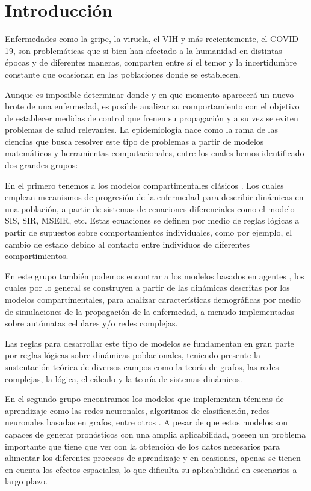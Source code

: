 \chapter{Introducción}\label{ch;Introduccion}

Enfermedades como la gripe, la viruela, el VIH y más recientemente, el COVID-19, son problemáticas que si bien han afectado a la humanidad en distintas épocas y de diferentes maneras, comparten entre sí el temor y la incertidumbre constante que ocasionan en las poblaciones donde se establecen.

Aunque es imposible determinar donde y en que momento aparecerá un nuevo brote de una enfermedad, es posible analizar su comportamiento con el objetivo de establecer medidas de control que frenen su propagación y a su vez se eviten problemas de salud relevantes. La epidemiología nace como la rama de las ciencias que busca resolver este tipo de problemas a partir de modelos matemáticos y herramientas computacionales, entre los cuales hemos identificado dos grandes grupos: 

En el primero tenemos a los modelos compartimentales clásicos \cite{kermack, miller, hertbert, mateModelsInPopulationAndEpidemiology, diego2010}. Los cuales emplean mecanismos de progresión de la enfermedad para describir dinámicas en una población, a partir de sistemas de ecuaciones diferenciales como el modelo SIS, SIR, MSEIR, etc. Estas ecuaciones se definen por medio de reglas lógicas a partir de supuestos sobre comportamientos individuales, como por ejemplo, el cambio de estado debido al contacto entre individuos de diferentes compartimientos.
    
En este grupo también podemos encontrar a los modelos basados en agentes \cite{spatialDependences,populationDensity,modelingEpidemicsUsingCA, globalStochastic}, los cuales por lo general se construyen a partir de las dinámicas descritas por los modelos compartimentales, para analizar características demográficas por medio de simulaciones de la propagación de la enfermedad, a menudo implementadas sobre autómatas celulares y/o redes complejas. 
    
Las reglas para desarrollar este tipo de modelos se fundamentan en gran parte por reglas lógicas sobre dinámicas poblacionales, teniendo presente la sustentación teórica de diversos campos como la teoría de grafos, las redes complejas, la lógica, el cálculo y la teoría de sistemas dinámicos.

En el segundo grupo encontramos los modelos que implementan técnicas de aprendizaje como las redes neuronales, algoritmos de clasificación, redes neuronales basadas en grafos, entre otros \cite{stayHome, epidemiologicalNeuralNetwork, colaGNN, combiningGraph, forecasting, fromNeuronsToEpidemics, networksAndepidemics, transfer2021}. A pesar de que estos modelos son capaces de generar pronósticos con una amplia aplicabilidad, poseen un problema importante que tiene que ver con la obtención de los datos necesarios para alimentar los diferentes procesos de aprendizaje y en ocasiones, apenas se tienen en cuenta los efectos espaciales, lo que dificulta su aplicabilidad en escenarios a largo plazo.

